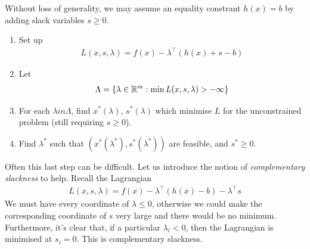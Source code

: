 \documentclass{../template/note}
\begin{document}
    \begin{algorithm}
        Without loss of generality, we may assume an equality constrant $h(x) = b$ by adding slack variables $s \geq 0$.
        \begin{enumerate}[label=\protect\circled{\arabic*}]
            \item Set up
            \begin{align*}
                L(x, s, \lambda) = f(x) - \lambda^\intercal (h(x)+s-b)
            \end{align*}
            \item Let
            \begin{align*}
                \Lambda = \{\lambda \in \mathbb R^m: \min L(x, s, \lambda) > -\infty\}
            \end{align*}
            \item For each $\lambda in \Lambda$, find $x^*(\lambda)$, $s^*(\lambda)$ which minimise $L$ for the unconstrained problem (still requiring $s \geq 0$).
            \item Find $\lambda^*$ such that $(x^*(\lambda^*), s^*(\lambda^*))$ are feasible, and $s^* \geq 0$.           
        \end{enumerate}      
    \end{algorithm}
    
    Often this last step can be difficult. Let us introduce the notion of \emph{complementary slackness} to help. Recall the Lagrangian
    \begin{align*}
        L(x, s, \lambda) = f(x) - \lambda^\intercal(h(x)-b) - \lambda^\intercal s
    \end{align*}
    We must have every coordinate of $\lambda \leq 0$, otherwise we could make the corresponding coordinate of $s$ very large and there would be no minimum. Furthermore, it's clear that, if a particular $\lambda_i < 0$, then the Lagrangian is minimised at $s_i=0$. This is complementary slackness.
    
\end{document}
